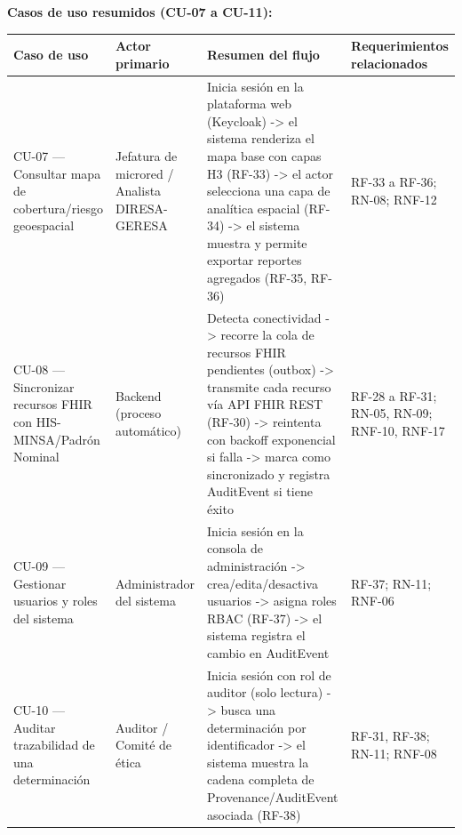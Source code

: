 \documentclass[11pt,a4paper]{article}
\begin{document}
\textbf{Casos de uso resumidos (CU-07 a CU-11):}

{\small
\begin{longtable}[]{@{}
  >{\raggedright\arraybackslash}p{}
  >{\raggedright\arraybackslash}p{}
  >{\raggedright\arraybackslash}p{}
  >{\raggedright\arraybackslash}p{}@{}}
\toprule\noalign{}
\begin{minipage}[b]{\linewidth}\raggedright
Caso de uso
\end{minipage} & \begin{minipage}[b]{\linewidth}\raggedright
Actor primario
\end{minipage} & \begin{minipage}[b]{\linewidth}\raggedright
Resumen del flujo
\end{minipage} & \begin{minipage}[b]{\linewidth}\raggedright
Requerimientos relacionados
\end{minipage} \\
\midrule\noalign{}
\endhead
\bottomrule\noalign{}
\endlastfoot
CU-07 --- Consultar mapa de cobertura/riesgo geoespacial & Jefatura de microred / Analista DIRESA-GERESA & Inicia sesión en la plataforma web (Keycloak) -\textgreater{} el sistema renderiza el mapa base con capas H3 (RF-33) -\textgreater{} el actor selecciona una capa de analítica espacial (RF-34) -\textgreater{} el sistema muestra y permite exportar reportes agregados (RF-35, RF-36) & RF-33 a RF-36; RN-08; RNF-12 \\
CU-08 --- Sincronizar recursos FHIR con HIS-MINSA/Padrón Nominal & Backend (proceso automático) & Detecta conectividad -\textgreater{} recorre la cola de recursos FHIR pendientes (outbox) -\textgreater{} transmite cada recurso vía API FHIR REST (RF-30) -\textgreater{} reintenta con backoff exponencial si falla -\textgreater{} marca como sincronizado y registra AuditEvent si tiene éxito & RF-28 a RF-31; RN-05, RN-09; RNF-10, RNF-17 \\
CU-09 --- Gestionar usuarios y roles del sistema & Administrador del sistema & Inicia sesión en la consola de administración -\textgreater{} crea/edita/desactiva usuarios -\textgreater{} asigna roles RBAC (RF-37) -\textgreater{} el sistema registra el cambio en AuditEvent & RF-37; RN-11; RNF-06 \\
CU-10 --- Auditar trazabilidad de una determinación & Auditor / Comité de ética & Inicia sesión con rol de auditor (solo lectura) -\textgreater{} busca una determinación por identificador -\textgreater{} el sistema muestra la cadena completa de Provenance/AuditEvent asociada (RF-38) & RF-31, RF-38; RN-11; RNF-08 \\

\end{longtable}}
\end{document}
